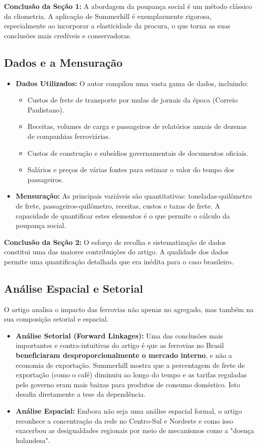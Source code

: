 \documentclass[12pt, a4paper]{article}
\begin{document}
\noindent\textbf{Conclusão da Seção 1:} A abordagem da poupança social é um método clássico da cliometria. A aplicação de Summerhill é exemplarmente rigorosa, especialmente ao incorporar a elasticidade da procura, o que torna as suas conclusões mais credíveis e conservadoras.

\subsection{Dados e a Mensuração}

\begin{itemize}
    \item \textbf{Dados Utilizados:} O autor compilou uma vasta gama de dados, incluindo:
        \begin{itemize}
            \item Custos de frete de transporte por mulas de jornais da época (Correio Paulistano).
            \item Receitas, volumes de carga e passageiros de relatórios anuais de dezenas de companhias ferroviárias.
            \item Custos de construção e subsídios governamentais de documentos oficiais.
            \item Salários e preços de várias fontes para estimar o valor do tempo dos passageiros.
        \end{itemize}
    \item \textbf{Mensuração:} As principais variáveis são quantitativas: toneladas-quilômetro de frete, passageiros-quilômetro, receitas, custos e taxas de frete. A capacidade de quantificar estes elementos é o que permite o cálculo da poupança social.
\end{itemize}

\noindent\textbf{Conclusão da Seção 2:} O esforço de recolha e sistematização de dados constitui uma das maiores contribuições do artigo. A qualidade dos dados permite uma quantificação detalhada que era inédita para o caso brasileiro.

\subsection{Análise Espacial e Setorial}
O artigo analisa o impacto das ferrovias não apenas no agregado, mas também na sua composição setorial e espacial.
\begin{itemize}
    \item \textbf{Análise Setorial (Forward Linkages):} Uma das conclusões mais importantes e contra-intuitivas do artigo é que as ferrovias no Brasil \textbf{beneficiaram desproporcionalmente o mercado interno}, e não a economia de exportação. Summerhill mostra que a percentagem de frete de exportação (como o café) diminuiu ao longo do tempo e as tarifas reguladas pelo governo eram mais baixas para produtos de consumo doméstico. Isto desafia diretamente a tese da dependência.
    \item \textbf{Análise Espacial:} Embora não seja uma análise espacial formal, o artigo reconhece a concentração da rede no Centro-Sul e Nordeste e como isso exacerbou as desigualdades regionais por meio de mecanismos como a "doença holandesa".
\end{itemize}
\end{document}
